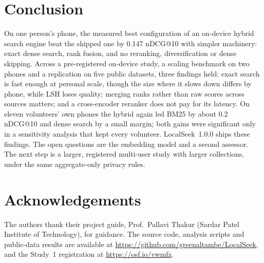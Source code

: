 \documentclass[11pt,a4paper]{article}
\makeatletter
\newcommand{\ndcg}{nDCG@10}
\makeatother
\begin{document}
\section{Conclusion}

On one person's phone, the measured best configuration of an on-device hybrid search engine beat the shipped one by 0.147 \ndcg{} with simpler machinery: exact dense search, rank fusion, and no reranking, diversification or dense skipping. Across a pre-registered on-device study, a scaling benchmark on two phones and a replication on five public datasets, three findings held: exact search is fast enough at personal scale, though the size where it slows down differs by phone, while LSH loses quality; merging ranks rather than raw scores across sources matters; and a cross-encoder reranker does not pay for its latency. On eleven volunteers' own phones the hybrid again led BM25 by about 0.2 \ndcg{} and dense search by a small margin; both gains were significant only in a sensitivity analysis that kept every volunteer. LocalSeek~1.0.0 ships these findings. The open questions are the embedding model and a second assessor. The next step is a larger, registered multi-user study with larger collections, under the same aggregate-only privacy rules.

\section*{Acknowledgements}

The authors thank their project guide, Prof.\ Pallavi Thakur (Sardar Patel Institute of Technology), for guidance. The source code, analysis scripts and public-data results are available at \url{https://github.com/greenaltambe/LocalSeek}, and the Study~1 registration at \url{https://osf.io/vwmfz}.



\end{document}
